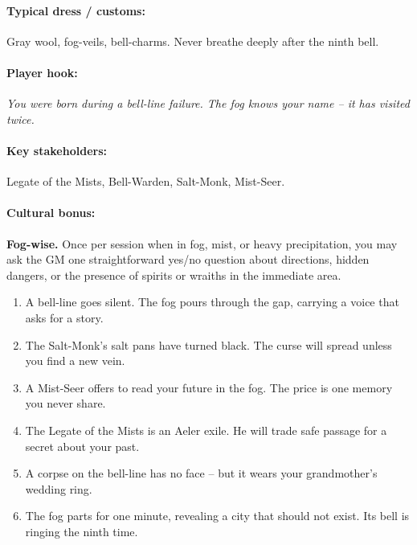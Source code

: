 \paragraph{Typical dress / customs:} Gray wool, fog-veils, bell-charms. Never breathe deeply after the ninth bell.

\paragraph{Player hook:} \emph{You were born during a bell-line failure. The fog knows your name -- it has visited twice.}

\paragraph{Key stakeholders:} Legate of the Mists, Bell-Warden, Salt-Monk, Mist-Seer.

\paragraph{Cultural bonus:} \textbf{Fog-wise.} Once per session when in fog, mist, or heavy precipitation, you may ask the GM one straightforward yes/no question about directions, hidden dangers, or the presence of spirits or wraiths in the immediate area.

\begin{tcolorbox}[colback=gray!5!white, colframe=gray!70!black, title=Mistlands Mini-Generator (d6),breakable]
\begin{enumerate}
\item A bell-line goes silent. The fog pours through the gap, carrying a voice that asks for a story.
\item The Salt-Monk's salt pans have turned black. The curse will spread unless you find a new vein.
\item A Mist-Seer offers to read your future in the fog. The price is one memory you never share.
\item The Legate of the Mists is an Aeler exile. He will trade safe passage for a secret about your past.
\item A corpse on the bell-line has no face -- but it wears your grandmother's wedding ring.
\item The fog parts for one minute, revealing a city that should not exist. Its bell is ringing the ninth time.
\end{enumerate}
\end{tcolorbox}

